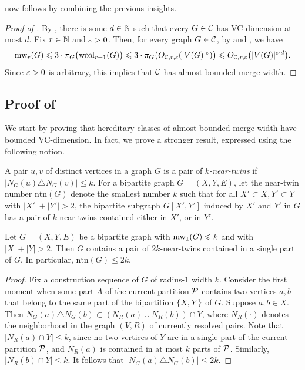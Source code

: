    now follows by combining the previous insights.
  \begin{proof}[Proof of ]
    By , there is some $d\in\N$ such that every $G\in\CC$ has VC-dimension at most $d$.
    Fix $r\in\N$ and $\eps>0$.
Then, for every graph $G\in\CC$, by  and , we have 
$$\mw_r(G)\le 3\cdot \pi_G\bigl(\wcol_{r+1}(G)\bigr)\le  3\cdot \pi_G\bigl(O_{\CC,r,\eps}(|V(G)|^\eps)\bigr)\le O_{\CC,r,\eps}\bigl(|V(G)|^{\eps\cdot d}\bigr).$$
Since $\eps>0$ is arbitrary, this implies that $\CC$ has almost bounded merge-width.
  \end{proof}

  \subsection{Proof of }


We start by proving that hereditary classes of almost bounded merge-width have bounded VC-dimension. 
In fact, we prove a stronger result, expressed using the following notion.

\newcommand{\ntn}{\mathrm{ntn}}

A pair $u,v$ of distinct vertices in a graph $G$ is a pair of \emph{$k$-near-twins} if $|N_G(u)\triangle N_G(v)|\le k$.
 For a bipartite graph $G=(X,Y,E)$, let the near-twin number $\ntn(G)$ denote 
 the smallest number $k$ such that 
for all $X'\subset X,Y'\subset Y$ with $|X'|+|Y'|>2$,
the bipartite subgraph $G[X',Y']$ induced by $X'$ and $Y'$  in $G$
has a pair of $k$-near-twins contained either in $X'$, or in $Y'$.

\begin{lemma}\label{lem:twins-bip}
    Let $G=(X,Y,E)$ be a bipartite graph with $\mw_1(G)\le k$
    and with $|X|+|Y|>2$.
    Then $G$ contains a pair of $2k$-near-twins
     contained in a single part of $G$. In particular, $\ntn(G)\le 2k$.
\end{lemma}
\begin{proof}
    Fix a construction sequence of $G$ of radius-$1$ width $k$. Consider the first moment when some part $A$ of the current partition $\cal P$ contains two vertices $a,b$ that belong to the same part of the bipartition $\set{X,Y}$ of $G$. Suppose $a,b\in X$. Then $N_G(a)\triangle N_G(b)\subset (N_R(a)\cup N_R(b))\cap Y$,
    where $N_R(\cdot)$ denotes the neighborhood in the graph $(V,R)$  of currently resolved pairs.
    Note that $|N_R(a)\cap Y|\le k$,
    since no two vertices of $Y$ are in a single part of the current partition $\cal P$, and $N_R(a)$ is contained in at most $k$ parts of $\cal P$. Similarly, $|N_R(b)\cap Y|\le k$.
    It follows that $|N_G(a)\triangle N_G(b)|\le 2k$.
\end{proof}

